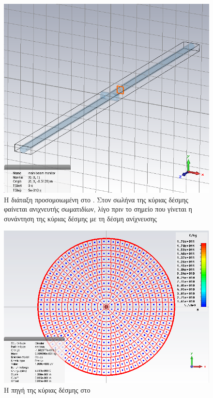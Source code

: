 \begin{figure}[tbh]
\includegraphics[width=\textwidth]{figures/CST-pic-monitor}
\centering
\caption[Η διάταξη προσομοιωμένη στο ]{Η διάταξη προσομοιωμένη στο . 
Στον σωλήνα της κύριας δέσμης φαίνεται ανιχνευτής σωματιδίων, λίγο πριν το σημείο που γίνεται η συνάντηση της κύριας δέσμης με τη δέσμη ανίχνευσης}
\label{fig:CST-PICmonitor}
\end{figure}

\begin{figure}[tbh]
\includegraphics[width=\textwidth]{figures/CST-main-beam-source}
\centering
\caption{Η πηγή της κύριας δέσμης στο }
\label{fig:CST-mainBeamSource}
\end{figure}


